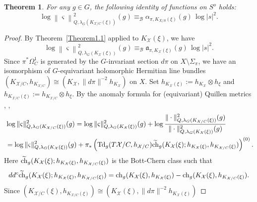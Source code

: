 \documentclass[amscd, leqno]{amsart}
\theoremstyle{plain}
\newtheorem{theorem}{Theorem}[section]
\theoremstyle{definition}
\theoremstyle{remark}
\newenvironment{pf}{\begin{proof}}{\end{proof}}
\begin{document}
\begin{theorem}
\label{Thm:Sing:Q:adj}
For any $g\in G$, the following identity of functions on $S^{o}$ holds:
$$
\log \left\| \varsigma \right\|^{2}_{Q,\lambda_{G}(K_{{\mathcal X}/C}(\xi))}(g) \equiv_{{\mathcal B}} \alpha_{\pi,K_{X/S}(\xi)}(g)\, \log | s |^{2}.
$$
\end{theorem}

\begin{pf}
By Theorem~\ref{Theorem1.1} applied to $K_{\mathcal X}(\xi)$, we have
\begin{equation}
\label{eqn:sing:eq:Q}
\log \left\| \varsigma \right\|^{2}_{Q,\lambda_{G}(K_{\mathcal X}(\xi))}(g) 
\equiv_{{\mathcal B}} {\mathfrak a}_{\pi, K_{\mathcal X}(\xi)}(g)\,\log | s |^{2}.
\end{equation}
Since $\pi^{*}\Omega^{1}_{C}$ is generated by the $G$-invariant section $d\pi$ on $X\setminus\Sigma_{\pi}$, 
we have an isomorphism of $G$-equivariant holomorphic Hermitian line bundles
$(K_{{\mathcal X}/C},h_{K_{{\mathcal X}/C}}) \cong (K_{\mathcal X},\|d\pi\|^{-2}h_{K_{\mathcal X}})$ on $X$. 
Set $h_{K_{\mathcal X}(\xi)} := h_{K_{\mathcal X}}\otimes h_{\xi}$ and $h_{K_{{\mathcal X}/C}(\xi)} := h_{K_{{\mathcal X}/C}}\otimes h_{\xi}$.
By the anomaly formula for (equivariant) Quillen metrics \cite[Th.\,2.5]{Bismut95}, \cite[I, Th.\,0.3]{BGS88}, 
\begin{equation}
\label{eqn:anomaly:eq:Q}
\begin{aligned}
\,
&
\log\|\varsigma\|^{2}_{Q,\lambda_{G}(K_{{\mathcal X}/C}(\xi))}(g)
=
\log\|\varsigma\|^{2}_{Q,\lambda_{G}(K_{\mathcal X}(\xi))}(g) 
+ 
\log\frac{\|\cdot\|^{2}_{Q,\lambda_{G}(K_{{\mathcal X}/C}(\xi))}(g)}{\|\cdot\|^{2}_{Q,\lambda_{G}(K_{\mathcal X}(\xi))}(g)}
\\
&=
\log\|\varsigma\|^{2}_{Q,\lambda_{G}(K_{\mathcal X}(\xi))}(g)
+
\pi_{*}\left( {\rm Td}_{g}(T{\mathcal X}/C,h_{{\mathcal X}/C})
\widetilde{{\rm ch}}_{g}(K_{\mathcal X}(\xi);h_{K_{\mathcal X}(\xi)},h_{K_{{\mathcal X}/C}(\xi)}) \right)^{(0)}.
\end{aligned}
\end{equation}
Here $\widetilde{{\rm ch}}_{g}(K_{{\mathcal X}}(\xi);h_{K_{\mathcal X}(\xi)},h_{K_{{\mathcal X}/C}(\xi)})$ is the Bott-Chern class such that
$$
dd^{c} \widetilde{{\rm ch}}_{g}(K_{\mathcal X}(\xi);h_{K_{\mathcal X}(\xi)},h_{K_{{\mathcal X}/C}(\xi)})
=
{\rm ch}_{g}(K_{\mathcal X}(\xi),h_{K_{\mathcal X}(\xi)}) - {\rm ch}_{g}(K_{\mathcal X}(\xi),h_{K_{{\mathcal X}/C}(\xi)}).
$$
Since
$(K_{{\mathcal X}/C}(\xi),h_{K_{{\mathcal X}/C}(\xi)}) \cong (K_{\mathcal X}(\xi),\|d\pi\|^{-2}h_{K_{\mathcal X}(\xi)})$ 

\end{pf}
\end{document}
